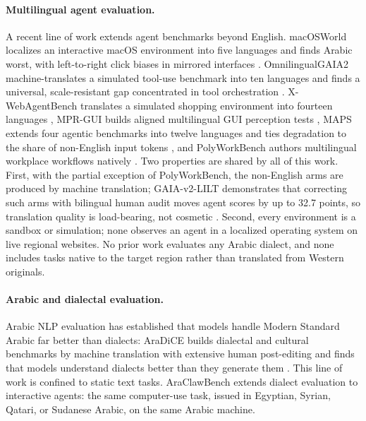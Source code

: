 \paragraph{Multilingual agent evaluation.}
A recent line of work extends agent benchmarks beyond English.
macOSWorld localizes an interactive macOS environment into five languages and
finds Arabic worst, with left-to-right click biases in mirrored interfaces
\citep{yang2025macosworld}. OmnilingualGAIA2 machine-translates a simulated
tool-use benchmark into ten languages and finds a universal, scale-resistant
gap concentrated in tool orchestration \citep{caciolai2026omnilingual}.
X-WebAgentBench translates a simulated shopping environment into fourteen
languages \citep{wang2025xwebagentbench}, MPR-GUI builds aligned multilingual
GUI perception tests \citep{chen2025mprgui}, MAPS extends four agentic
benchmarks into twelve languages and ties degradation to the share of
non-English input tokens \citep{hofman2025maps}, and PolyWorkBench authors
multilingual workplace workflows natively \citep{li2026polyworkbench}.
Two properties are shared by all of this work. First, with the partial
exception of PolyWorkBench, the non-English arms are produced by machine
translation; GAIA-v2-LILT demonstrates that correcting such arms with bilingual
human audit moves agent scores by up to 32.7 points, so translation quality is
load-bearing, not cosmetic \citep{kim2026lilt}. Second, every environment is a
sandbox or simulation; none observes an agent in a localized operating system
on live regional websites. No prior work evaluates any Arabic dialect, and none
includes tasks native to the target region rather than translated from Western
originals.

\paragraph{Arabic and dialectal evaluation.}
Arabic NLP evaluation has established that models handle Modern Standard
Arabic far better than dialects: AraDiCE builds dialectal and cultural
benchmarks by machine translation with extensive human post-editing and finds
that models understand dialects better than they generate them
\citep{mousi2024aradice}. This line of work is confined to static text tasks.
AraClawBench extends dialect evaluation to interactive agents: the same
computer-use task, issued in Egyptian, Syrian, Qatari, or Sudanese Arabic, on
the same Arabic machine.

